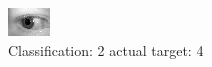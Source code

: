 \begin{figure}[h!]
\begin{center}
\includegraphics[width=0.60\columnwidth]{figures/ID853_class_2_target_4.png}
\end{center}
\caption{ Classification: 2 actual target: 4}
\label{fig:ID853_class_2_target_4}
\end{figure}
